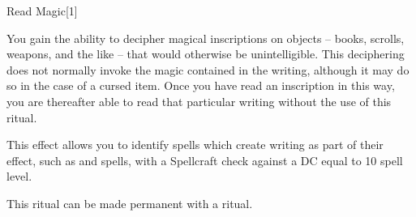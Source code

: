 \begin{spellsection}{Read Magic}[1]
    \begin{spellheader}
    \end{spellheader}
    \begin{spellcontent}
        \begin{spelltargetinginfo}
        \end{spelltargetinginfo}
        \begin{spelleffects}

            \spelleffect You gain the ability to decipher magical inscriptions on objects -- books, scrolls, weapons, and the like -- that would otherwise be unintelligible. This deciphering does not normally invoke the magic contained in the writing, although it may do so in the case of a cursed item. Once you have read an inscription in this way, you are thereafter able to read that particular writing without the use of this ritual.

            This effect allows you to identify spells which create writing as part of their effect, such as  and  spells, with a Spellcraft check against a DC equal to 10 \add spell level.
            \spelldur \durlong
        \end{spelleffects}
    \end{spellcontent}
    \begin{spellfooter}
        \spellnotes This ritual can be made permanent with a  ritual.
    \end{spellfooter}
\end{spellsection}

